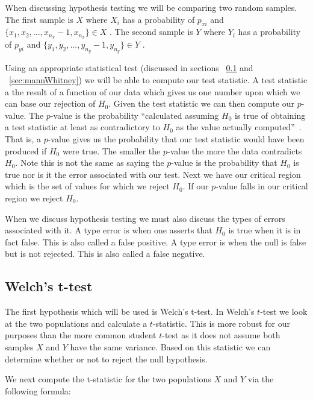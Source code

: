 When discussing hypothesis testing we will be comparing two random samples. The first sample is $X$ where  $X_i$ has a probability of  $p_{xi}$ and $\{x_1,x_2,...,x_{n_x}-1 , x_{n_x}\} \in X$ . The second sample is $Y$ where  $Y_i$ has a probability of  $p_{yi}$ and $\{y_1,y_2,...,y_{n_y}-1 , y_{n_y}\} \in Y$ .

Using an appropriate statistical test (discussed in sections ~\ref{sec:ttest} and ~\ref{sec:mannWhitney}) we will be able to compute our test statistic. A test statistic a the result of a function of our data which gives us one number upon which we can base our rejection of $H_0$. Given the test statistic we can then compute our $p$-value. The $p$-value is the probability ``calculated assuming $H_0$ is true of obtaining a test statistic at least as contradictory to $H_0$ as the value actually computed''~\cite{devore_probability_2011}. That is, a $p$-value gives us the probability that our test statistic would have been produced if $H_0$ were true. The smaller the $p$-value the more the data contradicts $H_0$. Note this is not the same as saying the $p$-value is the probability that $H_0$ is true nor is it the error associated with our test. Next we have our critical region which is the set of values for which we reject $H_0$. If our $p$-value falls in our critical region we reject $H_0$.

When we discuss hypothesis testing we must also discuss the types of errors associated with it. A type  error is when one asserts that $H_0$ is true when it is in fact false. This is also called a false positive. A type  error is when the null is false but is not rejected. This is also called a false negative. 

\subsection{Welch's t-test}\label{sec:ttest}

The first hypothesis which will be used is Welch's t-test\cite{welch_generalization_1947}. In Welch's $t$-test we look at the two populations and calculate a $t$-statistic. This is more robust for our purposes than the more common student $t$-test as it does not assume both samples $X$ and $Y$ have the same variance. Based on this statistic we can determine whether or not to reject the null hypothesis.  

We next compute the t-statistic for the two populations $X$ and $Y$ via the following formula:

